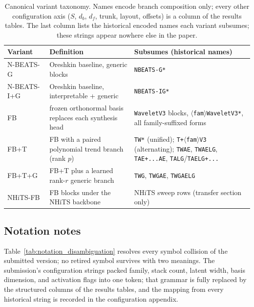 \begin{table}[t]
\centering
\small
\caption{Canonical variant taxonomy. Names encode branch composition only;
every other configuration axis ($S$, $d_b$, $d_f$, trunk, layout, offsets) is
a column of the results tables. The last column lists the historical encoded
names each variant subsumes; these strings appear nowhere else in the paper.}
\label{tab:variant_taxonomy}
\begin{tabular}{@{}lp{5.2cm}l@{}}
\toprule
Variant & Definition & Subsumes (historical names) \\
\midrule
N-BEATS-G & Oreshkin baseline, generic blocks &
  \texttt{NBEATS-G*} \\
N-BEATS-I+G & Oreshkin baseline, interpretable + generic &
  \texttt{NBEATS-IG*} \\
FB & frozen orthonormal basis replaces each synthesis head &
  \texttt{WaveletV3} blocks, \texttt{$\langle$fam$\rangle$WaveletV3*},
  all family-suffixed forms \\
FB+T & FB with a paired polynomial trend branch (rank $p$) &
  \texttt{TW*} (unified); \texttt{T+$\langle$fam$\rangle$V3}
  (alternating); \texttt{TWAE}, \texttt{TWAELG}, \texttt{TAE+...AE},
  \texttt{TALG}/\texttt{TAELG+...} \\
FB+T+G & FB+T plus a learned rank-$r$ generic branch &
  \texttt{TWG}, \texttt{TWGAE}, \texttt{TWGAELG} \\
NHiTS-FB & FB blocks under the NHiTS backbone &
  NHiTS sweep rows (transfer section only) \\
\bottomrule
\end{tabular}
\end{table}

\subsection{Notation notes}
\label{sec:method_notation}

Table~\ref{tab:notation_disambiguation} resolves every symbol collision of
the submitted version; no retired symbol survives with two meanings. The
submission's configuration strings packed family, stack count, latent width,
basis dimension, and activation flags into one token; that grammar is fully
replaced by the structured columns of the results tables, and the mapping
from every historical string is recorded in the configuration appendix.

